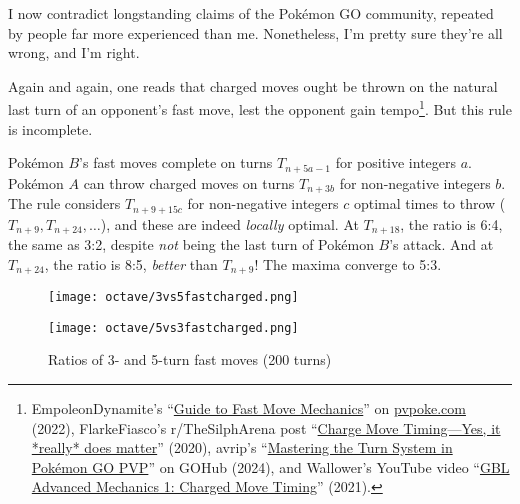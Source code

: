 \begin{tipbox}[title=Warning! Achtung! \begin{chinese}危险！\end{chinese} ¡Peligro! \begin{japanese}危険!\end{japanese} \textit{Tulaga faigata!}]
I now contradict longstanding claims of the Pokémon GO community, repeated by
  people far more experienced than me.
Nonetheless, I'm pretty sure they're all wrong, and I'm right.
\end{tipbox}
\noindent{}Again and again, one reads that charged moves ought be thrown on the natural last turn of an
 opponent's fast move, lest the opponent gain tempo\footnote{EmpoleonDynamite's ``\href{https://pvpoke.com/articles/strategy/guide-to-fast-move-registration/}{Guide to Fast Move Mechanics}''
 on \href{https://pvpoke.com}{pvpoke.com} (2022), FlarkeFiasco's r/TheSilphArena post ``\href{reddit.com/r/TheSilphArena/comments/fvu62a/charge\_move\_timing\_yes\_it\_really\_does\_matter/}{Charge Move Timing---Yes, it *really* does matter}'' (2020),
 avrip's ``\href{https://pokemongohub.net/post/pvp/mastering-the-turn-system-in-pokemon-go-pvp/}{Mastering the Turn System in Pokémon GO PVP}'' on GOHub (2024),
 and Wallower's YouTube video ``\href{https://www.youtube.com/watch?v=pAtCo8xg700}{GBL Advanced Mechanics 1: Charged Move Timing}'' (2021).}.
But this rule is incomplete.

Pokémon $B$'s fast moves complete on turns $T_{n+5a-1}$ for positive integers $a$.
Pokémon $A$ can throw charged moves on turns $T_{n+3b}$ for non-negative integers $b$.
The rule considers $T_{n+9+15c}$ for non-negative integers $c$ optimal times to throw
 ($T_{n+9}, T_{n+24}, \dots$), and these are indeed \textit{locally} optimal.
At $T_{n+18}$, the ratio is 6:4, the same as 3:2, despite \textit{not} being the last turn of Pokémon $B$'s attack.
And at $T_{n+24}$, the ratio is 8:5, \textit{better} than $T_{n+9}$!
The maxima converge to 5:3.

\begin{figure}
\begin{minipage}{0.5\textwidth}\centering
\texttt{[image: octave/3vs5fastcharged.png]}
\end{minipage}
\begin{minipage}{0.5\textwidth}\centering
\texttt{[image: octave/5vs3fastcharged.png]}
\end{minipage}
\caption{Ratios of 3- and 5-turn fast moves (200 turns)\label{figure:35ratios}}
\end{figure}

